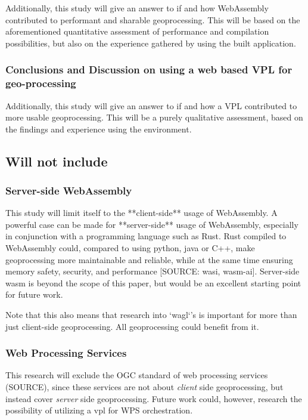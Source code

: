 Additionally, this study will give an answer to if and how WebAssembly contributed to performant and sharable geoprocessing. 
This will be based on the aforementioned quantitative assessment of performance and compilation possibilities, but also on the experience gathered by using the built application.  

\subsubsection*{Conclusions and Discussion on using a web based VPL for geo-processing}

Additionally, this study will give an answer to if and how a VPL contributed to more usable geoprocessing. This will be a purely qualitative assessment, based on the findings and experience using the environment.  


\subsection*{Will not include}

\subsubsection*{Server-side WebAssembly} %

This study will limit itself to the **client-side** usage of WebAssembly. 
A powerful case can be made for **server-side** usage of WebAssembly, especially in conjunction with a programming language such as Rust. 
Rust compiled to WebAssembly could, compared to using python, java or C++, make geoprocessing more maintainable and reliable, while at the same time ensuring memory safety, security, and performance [SOURCE: wasi, wasm-ai]. 
Server-side wasm is beyond the scope of this paper, but would be an excellent starting point for future work. 

Note that this also means that research into `wagl`'s is important for more than just client-side geoprocessing. All geoprocessing could benefit from it.



\subsubsection*{Web Processing Services} %

This research will exclude the OGC standard of web processing services (SOURCE), since these services are not about \emph{client} side geoprocessing, but instead cover \emph{server} side geoprocessing. 
Future work could, however, research the possibility of utilizing a vpl for WPS orchestration. 



